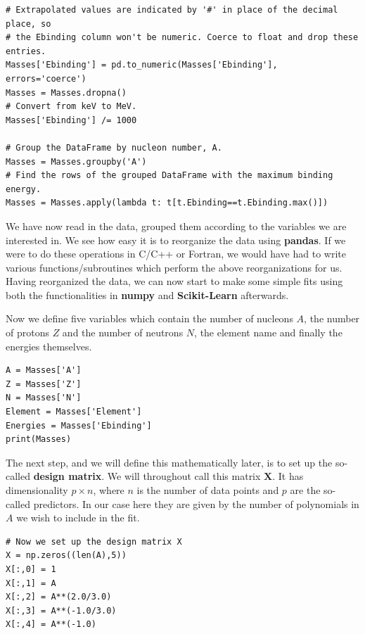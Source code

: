 \documentclass{beamer}
\begin{document}
\begin{frame}
\begin{verbatim}
# Extrapolated values are indicated by '#' in place of the decimal place, so
# the Ebinding column won't be numeric. Coerce to float and drop these entries.
Masses['Ebinding'] = pd.to_numeric(Masses['Ebinding'], errors='coerce')
Masses = Masses.dropna()
# Convert from keV to MeV.
Masses['Ebinding'] /= 1000

# Group the DataFrame by nucleon number, A.
Masses = Masses.groupby('A')
# Find the rows of the grouped DataFrame with the maximum binding energy.
Masses = Masses.apply(lambda t: t[t.Ebinding==t.Ebinding.max()])

\end{verbatim}


We have now read in the data, grouped them according to the variables we are interested in. 
We see how easy it is to reorganize the data using \textbf{pandas}. If we
were to do these operations in C/C++ or Fortran, we would have had to
write various functions/subroutines which perform the above
reorganizations for us.  Having reorganized the data, we can now start
to make some simple fits using both the functionalities in \textbf{numpy} and
\textbf{Scikit-Learn} afterwards. 

Now we define five variables which contain
the number of nucleons $A$, the number of protons $Z$ and the number of neutrons $N$, the element name and finally the energies themselves.







\begin{verbatim}
A = Masses['A']
Z = Masses['Z']
N = Masses['N']
Element = Masses['Element']
Energies = Masses['Ebinding']
print(Masses)

\end{verbatim}

The next step, and we will define this mathematically later, is to set up the so-called \textbf{design matrix}. We will throughout call this matrix $\bm{X}$.
It has dimensionality $p\times n$, where $n$ is the number of data points and $p$ are the so-called predictors. In our case here they are given by the number of polynomials in $A$ we wish to include in the fit. 








\begin{verbatim}
# Now we set up the design matrix X
X = np.zeros((len(A),5))
X[:,0] = 1
X[:,1] = A
X[:,2] = A**(2.0/3.0)
X[:,3] = A**(-1.0/3.0)
X[:,4] = A**(-1.0)


\end{verbatim}
\end{frame}
\end{document}
